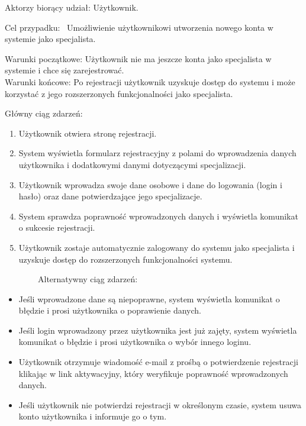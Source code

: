 \documentclass[
]{article}
\providecommand{\tightlist}{%
  \setlength{\itemsep}{0pt}\setlength{\parskip}{0pt}}
\begin{document}
{Aktorzy biorący udział: Użytkownik.}

{Cel przypadku: ~Umożliwienie użytkownikowi utworzenia nowego konta w
systemie jako specjalista.}

{Warunki początkowe: Użytkownik nie ma jeszcze konta jako specjalista w
systemie i chce się zarejestrować.\\
Warunki końcowe: Po rejestracji użytkownik uzyskuje dostęp do systemu i
może korzystać z jego rozszerzonych funkcjonalności jako specjalista.}

{Główny ciąg zdarzeń:}

\begin{enumerate}
\tightlist
\item
  {Użytkownik otwiera stronę rejestracji.}
\item
  {System wyświetla formularz rejestracyjny z polami do wprowadzenia
  danych użytkownika i dodatkowymi danymi dotyczącymi specjalizacji.}
\item
  {Użytkownik wprowadza swoje dane osobowe i dane do logowania (login i
  hasło) oraz dane potwierdzające jego specjalizacje.}
\item
  {System sprawdza poprawność wprowadzonych danych i wyświetla komunikat
  o sukcesie rejestracji.}
\item
  {Użytkownik zostaje automatycznie zalogowany do systemu jako
  specjalista i uzyskuje dostęp do rozszerzonych funkcjonalności
  systemu.}
\end{enumerate}

{~~~~~~~~Alternatywny ciąg zdarzeń:}

\begin{itemize}
\tightlist
\item
  {Jeśli wprowadzone dane są niepoprawne, system wyświetla komunikat o
  błędzie i prosi użytkownika o poprawienie danych.}
\item
  {Jeśli login wprowadzony przez użytkownika jest już zajęty, system
  wyświetla komunikat o błędzie i prosi użytkownika o wybór innego
  loginu.}
\item
  {Użytkownik otrzymuje wiadomość e-mail z prośbą o potwierdzenie
  rejestracji klikając w link aktywacyjny, który weryfikuje poprawność
  wprowadzonych danych.}
\item
  {Jeśli użytkownik nie potwierdzi rejestracji w określonym czasie,
  system usuwa konto użytkownika i informuje go o tym.\\
  \strut \\
  }
\end{itemize}
\end{document}

